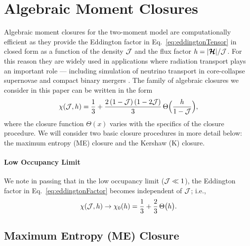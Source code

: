 \section{Algebraic Moment Closures}
\label{sec:algebraicClosure}

Algebraic moment closures for the two-moment model are computationally efficient as they provide the Eddington factor in Eq.~\eqref{eq:eddingtonTensor} in closed form as a function of the density $\mathcal{J}$ and the flux factor $h=|\boldsymbol{\mathcal{H}}|/\mathcal{J}$.  
For this reason they are widely used in applications where radiation transport plays an important role --- including simulation of neutrino transport in core-collapse supernovae \cite{roberts_etal_2016} and compact binary mergers \cite{foucart_etal_2015}.  
The family of algebraic closures we consider in this paper can be written in the form \cite{cernohorskyBludman_1994}
\begin{equation}
  \chi(\mathcal{J},h)=\frac{1}{3}+\frac{2\,(1-\mathcal{J})\,(1-2\mathcal{J})}{3}\,\Theta\Big(\frac{h}{1-\mathcal{J}}\Big),
  \label{eq:eddingtonFactor}
\end{equation}
where the closure function $\Theta(x)$ varies with the specifics of the closure procedure.  
We will consider two basic closure procedures in more detail below: the maximum entropy (ME) closure and the Kershaw (K) closure.  

\paragraph{Low Occupancy Limit}
We note in passing that in the low occupancy limit ($\mathcal{J}\ll1$), the Eddington factor in Eq.~\eqref{eq:eddingtonFactor} becomes independent of $\mathcal{J}$; i.e.,
\begin{equation}
  \chi(\mathcal{J},h)\to\chi_{0}(h)=\frac{1}{3}+\frac{2}{3}\,\Theta\big(h\big).  
  \label{eq:eddingtonFactorLow}
\end{equation}

\subsection{Maximum Entropy (ME) Closure}

